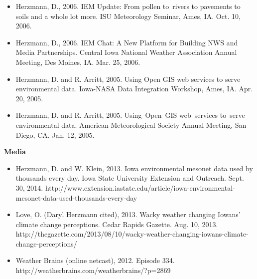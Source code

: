 \begin{itemize}
\item Herzmann, D., 2006. IEM Update: From pollen to rivers to pavements to soils and a whole lot more. ISU Meteorology Seminar, Ames, IA. Oct. 10, 2006.
\item Herzmann, D., 2006. IEM Chat: A New Platform for Building NWS and Media Partnerships. Central Iowa National Weather Association Annual Meeting, Des Moines, IA. Mar. 25, 2006.
\item Herzmann, D. and R. Arritt, 2005. Using Open GIS web services to serve environmental data. Iowa-NASA Data Integration Workshop, Ames, IA. Apr. 20, 2005.
\item Herzmann, D. and R. Arritt, 2005. Using Open GIS web services to serve environmental data. American Meteorological Society Annual Meeting, San Diego, CA. Jan. 12, 2005.
\end{itemize}

%
\normalsize \sf
\normalsize \bf Media
\normalsize \sf
\begin{itemize}
\item Herzmann, D. and W. Klein, 2013. Iowa environmental mesonet data used by thousands every day. Iowa State University Extension and Outreach. Sept. 30, 2014. http://www.extension.iastate.edu/article/iowa-environmental-mesonet-data-used-thousands-every-day
\item Love, O. (Daryl Herzmann cited), 2013. Wacky weather changing Iowans’ climate change perceptions. Cedar Rapids Gazette. Aug. 10, 2013. http://thegazette.com/2013/08/10/wacky-weather-changing-iowans-climate-change-perceptions/
\item Weather Brains (online netcast), 2012. Episode 334. http://weatherbrains.com/weatherbrains/?p=2869
\end{itemize}


\pagebreak

